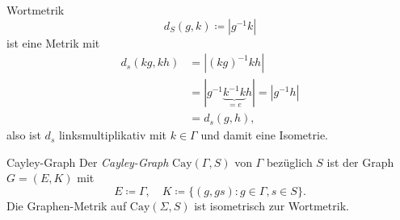 \begin{definition}{Wortmetrik}
  \begin{equation*}
    d_S(g, k) \coloneqq |g^{-1}k|
  \end{equation*}
  ist eine Metrik mit
  \begin{align*}
    d_s(kg,kh) &= |(kg)^{-1}kh| \\ 
    &= |g^{-1}\underbrace{k^{-1}k}_{=e}h| = |g^{-1}h| \\
    &= d_s(g,h)\text{,}
  \end{align*}
  also ist $ d_s $ linksmultiplikativ mit $ k \in \Gamma $ und damit eine Isometrie.
\end{definition}

\begin{definition}{Cayley-Graph}
  Der \emph{Cayley-Graph} $ \text{Cay}(\Gamma, S) $ von $ \Gamma $ bezüglich $ S $ ist der Graph $ G = (E, K) $ mit
  \begin{equation*}
    E \coloneqq \Gamma, \quad K \coloneqq \{ (g, gs) : g \in \Gamma, s \in S \}\text{.}
  \end{equation*}
  Die Graphen-Metrik auf $ \text{Cay}(\Sigma, S) $ ist isometrisch zur Wortmetrik.
\end{definition}

